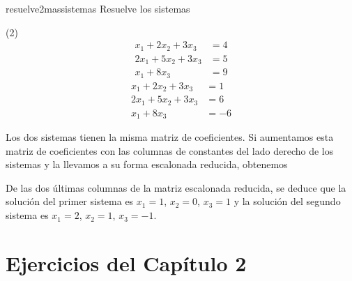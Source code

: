 \begin{examplebox}{}{resuelve2massistemas}
    Resuelve los sistemas
    \begin{tasks}(2)
        \task \vspace{-0.7cm}\begin{align*}
            x_1 + 2x_2 + 3x_3 & = 4 \\
            2x_1 + 5x_2 + 3x_3 & = 5 \\
            x_1 + 8x_3 & = 9
        \end{align*}
        \task \vspace{-0.7cm}\begin{align*}
            x_1 + 2x_2 + 3x_3 & = 1 \\
            2x_1 + 5x_2 + 3x_3 & = 6 \\
            x_1 + 8x_3 & = -6
        \end{align*}
    \end{tasks}
    \solucion Los dos sistemas tienen la misma matriz de coeficientes. Si aumentamos esta matriz de coeficientes con las columnas de constantes del lado derecho de los sistemas y la llevamos a su forma escalonada reducida, obtenemos
    \begin{matrizn}
    \end{matrizn}
    De las dos últimas columnas de la matriz escalonada reducida, se deduce que la solución del primer sistema es $x_1 = 1$, $x_2 = 0$, $x_3 = 1$ y la solución del segundo sistema es $x_1 = 2$, $x_2 = 1$, $x_3 = -1$.
\end{examplebox}

\newpage

\section{Ejercicios del Capítulo 2}

